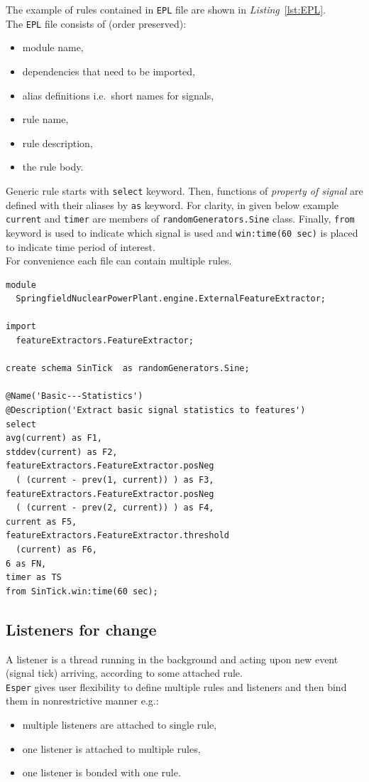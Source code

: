 \documentclass[11pt, letterpaper]{article}            %
\begin{document}
The example of rules contained in \texttt{EPL} file are shown in \emph{Listing}~\ref{lst:EPL}.\\
The \texttt{EPL} file consists of (order preserved):
\begin{itemize}
  \item module name,
  \item dependencies that need to be imported,
  \item alias definitions i.e.\ short names for signals,
  \item rule name,
  \item rule description,
  \item the rule body.
\end{itemize}
Generic rule starts with \texttt{select} keyword. Then, functions of \emph{property of signal} are defined with their aliases by \texttt{as} keyword. For clarity, in given below example \texttt{current} and \texttt{timer} are members of \texttt{randomGenerators.Sine} class. Finally, \texttt{from} keyword is used to indicate which signal is used and \texttt{win:time(60 sec)} is placed to indicate time period of interest.\\
For convenience each file can contain multiple rules.

\vspace{1em}
\begin{lstlisting}
module
  SpringfieldNuclearPowerPlant.engine.ExternalFeatureExtractor;

import
  featureExtractors.FeatureExtractor;

create schema SinTick  as randomGenerators.Sine;

@Name('Basic---Statistics')
@Description('Extract basic signal statistics to features')
select
avg(current) as F1,
stddev(current) as F2,
featureExtractors.FeatureExtractor.posNeg
  ( (current - prev(1, current)) ) as F3,
featureExtractors.FeatureExtractor.posNeg
  ( (current - prev(2, current)) ) as F4,
current as F5,
featureExtractors.FeatureExtractor.threshold
  (current) as F6,
6 as FN,
timer as TS
from SinTick.win:time(60 sec);
\end{lstlisting}


\subsection{Listeners for change\label{sec:listeners}}
A listener is a thread running in the background and acting upon new event (signal tick) arriving, according to some attached rule.\\
\texttt{Esper} gives user flexibility to define multiple rules and listeners and then bind them in nonrestrictive manner e.g.:
\begin{itemize}
\item multiple listeners are attached to single rule,
\item one listener is attached to multiple rules,
\item one listener is bonded with one rule.
\end{itemize}
\end{document}
